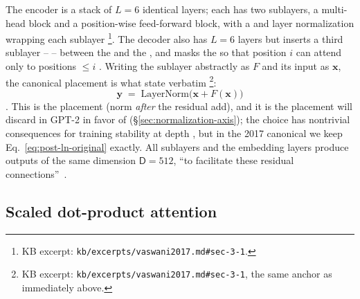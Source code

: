 The encoder is a stack of $L = 6$ identical layers; each has two
sublayers, a multi-head  block and a position-wise
feed-forward block, with a  and layer
normalization wrapping each sublayer%
\footnote{KB excerpt: \texttt{kb/excerpts/vaswani2017.md\#sec-3-1}.}.
The decoder also has $L = 6$ layers but inserts a third sublayer --
  -- between the  and
the , and masks the  so that position $i$ can attend
only to positions $\leq i$ \citep[\S 3.1]{vaswani2017}. Writing the
sublayer abstractly as $F$ and its input as $\mathbf{x}$, the
canonical placement is what \citet{vaswani2017} state verbatim%
\footnote{KB excerpt: \texttt{kb/excerpts/vaswani2017.md\#sec-3-1}, the same anchor as immediately above.}:
\begin{equation}
  \mathbf{y} \;=\; \mathrm{LayerNorm}\bigl(\mathbf{x} + F(\mathbf{x})\bigr)
  \tag{Vaswani--\S 3.1}
  \label{eq:post-ln-original}
\end{equation}
\citep[\S 3.1]{vaswani2017}. This is the \emph{} placement
(norm \emph{after} the residual add), and it is the placement
\citet{radford2019-gpt2} will discard in GPT-2 in favor of 
(\S\ref{sec:normalization-axis}); the choice has nontrivial
consequences for training stability at depth \citep{xiong2020}, but
in the 2017 canonical we keep Eq.~\eqref{eq:post-ln-original}
exactly. All sublayers and the embedding layers produce outputs of
the same dimension $\mathsf{D} = 512$, ``to facilitate these residual
connections''~\citep[\S 3.1]{vaswani2017}.

\subsection{Scaled dot-product attention}
\label{sec:canonical-attention}

